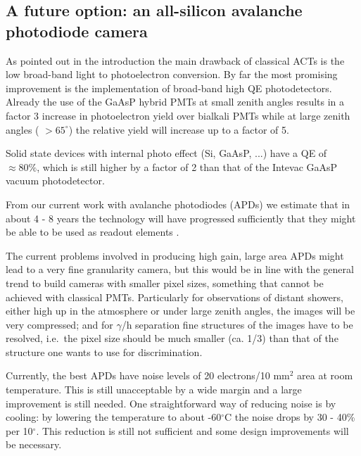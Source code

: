 \subsection{A future option: an all-silicon avalanche photodiode camera}


\medskip As pointed out in the introduction the main drawback of classical
ACTs is the low broad-band light to photoelectron conversion. By far the most
promising improvement is the implementation of broad-band high QE
photodetectors. Already the use of the GaAsP hybrid PMTs at small zenith
angles results in a factor 3 increase in photoelectron yield over bialkali
PMTs while at large zenith angles ( $>65^{\circ }$) the relative
yield will increase up to a factor of 5.

Solid state devices with internal photo effect (Si, GaAsP, ...) have a
QE of $\approx 80\%$, which is still higher by a factor of 2 than
that of the Intevac GaAsP vacuum photodetector.

From our current work with avalanche photodiodes (APDs) we estimate that in
about 4 - 8 years the technology will have progressed sufficiently that
they might be able to be used as readout elements \cite{lorenz:94,holl:95,pichler:97}.

The current problems involved in producing high gain, large area APDs might
lead to a very fine granularity camera, but this would be in line with the
general trend to build cameras with smaller pixel sizes, something that
cannot be achieved with classical PMTs. Particularly for
observations of distant showers, either high up in the atmosphere or under
large zenith angles, the images will be very compressed; and for $\gamma $/h
separation fine structures of the images have to be resolved, i.e.\ the pixel
size should be much smaller (ca. 1/3) than that of the structure one wants
to use for discrimination.

Currently, the best APDs have noise levels of 20 electrons/10 mm$^{2}$ area
at room temperature. This is still unacceptable by a wide margin and a large
improvement is still needed. One straightforward way of reducing noise is by
cooling: by lowering the temperature to about -60$^{\circ }$C the noise
drops by 30 - 40\% per 10$^{\circ }$. This
reduction is still not sufficient and some design improvements will be
necessary.

